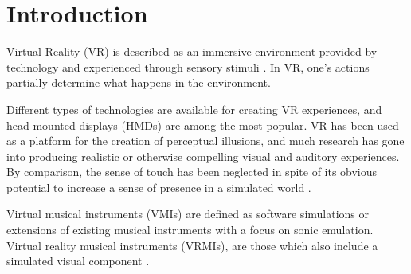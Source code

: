 \documentclass{article}
\title{\papertitle}
\begin{document}
%
\capstartfalse
\maketitle
\capstarttrue
%
\begin{abstract}
This paper presents DigiDrum -- a novel virtual reality musical instrument which consists of a physical drum augmented by virtual reality to produce enhanced auditory and haptic feedback. The design and implementation of the instrument-setup are detailed together with the preliminary results of a user study which investigates user's haptic perception of the material stiffness of the drum membrane. The experiment tests whether tension in the membrane simulation and sound damping (how fast the sound dies out) change the user’s perception of membrane stiffness. The preliminary results show that higher values for both tension and damping give the illusion of higher material stiffness in the drum membrane, where the sound damping appears to be the more important factor. The ultimate goal of this work is twofold: on the one hand it introduces an instrument which allows for enhanced musical expression possibilities through virtual reality. On the other hand, it presents an early  investigation on how haptics influence user interaction in virtual reality musical instruments by presenting a preliminary study on this.
\end{abstract}

\section{Introduction}\label{sec:introduction}
Virtual Reality (VR) is described as an immersive environment provided by technology and experienced through sensory stimuli \cite{Serafin:2017}. In VR, one's actions partially determine what happens in the environment. 

Different types of technologies are available for creating VR experiences, and head-mounted displays (HMDs) are among the most popular. VR has been used as a platform for the creation of perceptual illusions, and much research has gone into producing realistic or otherwise compelling visual and auditory experiences. By comparison, the sense of touch has been neglected in spite of its obvious potential to increase a sense of presence in a simulated world \cite{Serafin:2017}.

Virtual musical instruments (VMIs) are defined as software simulations or extensions of existing musical instruments with a focus on sonic emulation. Virtual reality musical instruments (VRMIs), are those which also include a simulated visual component \cite{Serafin:2016}. 
\end{document}

